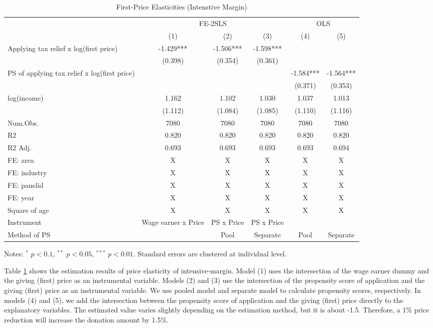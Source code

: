 \documentclass[
  11pt,
  a4paper,
]{article}
\begin{document}
\begin{table}

\caption{\label{tab:intensive}First-Price Elasticities (Intenstive Margin)}
\centering
\fontsize{9}{11}\selectfont
\begin{threeparttable}
\begin{tabular}[t]{lccccc}
\toprule
\multicolumn{1}{c}{ } & \multicolumn{3}{c}{FE-2SLS} & \multicolumn{2}{c}{OLS} \\
\cmidrule(l{3pt}r{3pt}){2-4} \cmidrule(l{3pt}r{3pt}){5-6}
  & (1) & (2) & (3) & (4) & (5)\\
\midrule
Applying tax relief x log(first price) & -1.429*** & -1.506*** & -1.598*** &  & \\
 & (0.398) & (0.354) & (0.361) &  & \\
PS of applying tax relief x log(first price) &  &  &  & -1.584*** & -1.564***\\
 &  &  &  & (0.371) & (0.353)\\
log(income) & 1.162 & 1.102 & 1.030 & 1.037 & 1.013\\
 & (1.112) & (1.084) & (1.085) & (1.110) & (1.116)\\
\midrule
Num.Obs. & 7080 & 7080 & 7080 & 7080 & 7080\\
R2 & 0.820 & 0.820 & 0.820 & 0.820 & 0.820\\
R2 Adj. & 0.693 & 0.693 & 0.693 & 0.693 & 0.694\\
FE: area & X & X & X & X & X\\
FE: industry & X & X & X & X & X\\
FE: panelid & X & X & X & X & X\\
FE: year & X & X & X & X & X\\
Square of age & X & X & X & X & X\\
Instrument & Wage earner x Price & PS x Price & PS x Price &  & \\
Method of PS &  & Pool & Separate & Pool & Separate\\
\bottomrule
\end{tabular}
\begin{tablenotes}
\item Notes: $^{*}$ $p < 0.1$, $^{**}$ $p < 0.05$, $^{***}$ $p < 0.01$. Standard errors are clustered at individual level.
\end{tablenotes}
\end{threeparttable}
\end{table}

Table \ref{tab:intensive} shows
the estimation results of price elasticity of intensive-margin.
Model (1) uses the intersection of the wage earner dummy and
the giving (first) price as an instrumental variable.
Models (2) and (3) use
the intersection of the propensity score of application and
the giving (first) price as an instrumental variable.
We use pooled model and separate model to calculate propensity scores,
respectively.
In models (4) and (5), we add the intersection between
the propensity score of application and the giving (first) price
directly to the explanatory variables.
The estimated value varies slightly depending on the estimation method,
but it is about -1.5.
Therefore, a 1\% price reduction will increase the donation amount by 1.5\%.
\end{document}
